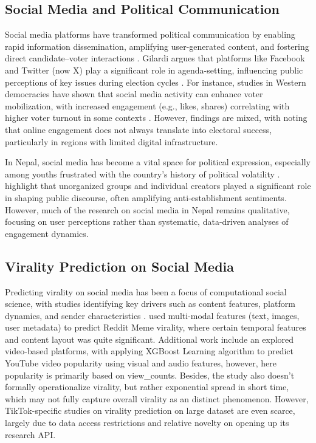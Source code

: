 \documentclass[12pt,a4paper]{report}
\begin{document}
\subsection{Social Media and Political Communication}

Social media platforms have transformed political communication by enabling rapid information dissemination, amplifying user-generated content, and fostering direct candidate–voter interactions \parencite{van2013socialmedia}. Gilardi argues that platforms like Facebook and Twitter (now X) play a significant role in agenda-setting, influencing public perceptions of key issues during election cycles \parencite{Gilardi02012022}. For instance, studies in Western democracies have shown that social media activity can enhance voter mobilization, with increased engagement (e.g., likes, shares) correlating with higher voter turnout in some contexts \parencite{bode2014campaign}. However, findings are mixed, with \parencite{piatak2021does} noting that online engagement does not always translate into electoral success, particularly in regions with limited digital infrastructure.

In Nepal, social media has become a vital space for political expression, especially among youths frustrated with the country’s history of political volatility \parencite{bhandari2024weaponizing}. \parencite{dahal2023influence} highlight that unorganized groups and individual creators played a significant role in shaping public discourse, often amplifying anti-establishment sentiments. However, much of the research on social media in Nepal remains qualitative, focusing on user perceptions rather than systematic, data-driven analyses of engagement dynamics. 

\newpage
\subsection{Virality Prediction on Social Media}

Predicting virality on social media has been a focus of computational social science, with studies identifying key drivers such as content features, platform dynamics, and sender characteristics \parencite{berger2012viral}. \parencite{SahJordan2025DecodingReddit} used multi-modal features (text, images, user metadata) to predict Reddit Meme virality, where certain temporal features and content layout was quite significant. Additional work include an  explored video-based platforms, with \parencite{nisa2021optimizing} applying XGBoost Learning algorithm to predict YouTube video popularity using visual and audio features, however, here popularity is primarily based on view\_counts. Besides, the study also doesn't formally operationalize virality, but rather exponential spread in short time, which may not fully capture overall virality as an distinct phenomenon. However, TikTok-specific studies on virality prediction on large dataset are even scarce, largely due to data access restrictions and relative novelty on opening up its research API.
\end{document}
